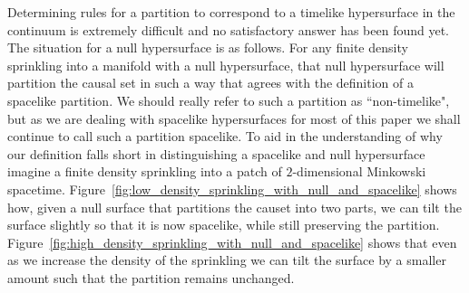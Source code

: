 \documentclass[12pt]{article}
\begin{document}
Determining rules for a partition to correspond to a timelike hypersurface in the continuum is extremely difficult and no satisfactory answer has been found yet. The situation for a null hypersurface is as follows. For any finite density sprinkling into a manifold with a null hypersurface, that null hypersurface will partition the causal set in such a way that agrees with the definition of a spacelike partition. We should really refer to such a partition as ``non-timelike", but as we are dealing with spacelike hypersurfaces for most of this paper we shall continue to call such a partition spacelike. To aid in the understanding of why our definition falls short in distinguishing a spacelike and null hypersurface imagine a finite density sprinkling into a patch of $2$-dimensional Minkowski spacetime. Figure~\ref{fig:low_density_sprinkling_with_null_and_spacelike} shows how, given a null surface that partitions the causet into two parts, we can tilt the surface slightly so that it is now spacelike, while still preserving the partition. Figure~\ref{fig:high_density_sprinkling_with_null_and_spacelike} shows that even as we increase the density of the sprinkling we can tilt the surface by a smaller amount such that the partition remains unchanged.
\end{document}
